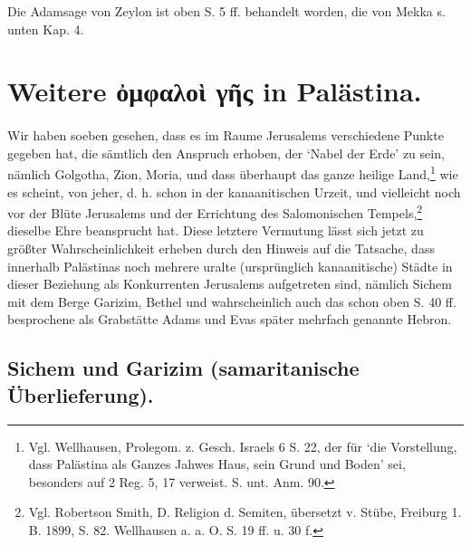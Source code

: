 \documentclass[a4paper, 11pt, oneside]{article}
\begin{document}
Die Adamsage von Zeylon ist oben S. 5 ff. behandelt worden, die von Mekka s. unten Kap. 4.
\clearpage
\section{Weitere ὀμφαλοὶ γῆς in Palästina.}
\paragraph{}
Wir haben soeben gesehen, dass es im Raume Jerusalems verschiedene Punkte gegeben hat, die sämtlich den Anspruch erhoben, der `Nabel der Erde' zu sein, nämlich Golgotha, Zion, Moria, und dass überhaupt das ganze heilige Land,\footnote{Vgl. Wellhausen, Prolegom. z. Gesch. Israels 6 S. 22, der für `die Vorstellung, dass Palästina als Ganzes Jahwes Haus, sein Grund und Boden' sei, besonders auf 2 Reg. 5, 17 verweist. S. unt. Anm. 90.} wie es scheint, von jeher, d. h. schon in der kanaanitischen Urzeit, und vielleicht noch vor der Blüte Jerusalems und der Errichtung des Salomonischen Tempels,\footnote{Vgl. Robertson Smith, D. Religion d. Semiten, übersetzt v. Stübe, Freiburg 1. B. 1899, S. 82. Wellhausen a. a. O. S. 19 ff. u. 30 f.} dieselbe Ehre beansprucht hat. Diese letztere Vermutung lässt sich jetzt zu größter Wahrscheinlichkeit erheben durch den Hinweis auf die Tatsache, dass innerhalb Palästinas noch mehrere uralte (ursprünglich kanaanitische) Städte in dieser Beziehung als Konkurrenten Jerusalems aufgetreten sind, nämlich Sichem mit dem Berge Garizim, Bethel und wahrscheinlich auch das schon oben S. 40 ff. besprochene als Grabstätte Adams und Evas später mehrfach genannte Hebron.

\subsection{Sichem und Garizim (samaritanische Überlieferung).}
\end{document}
